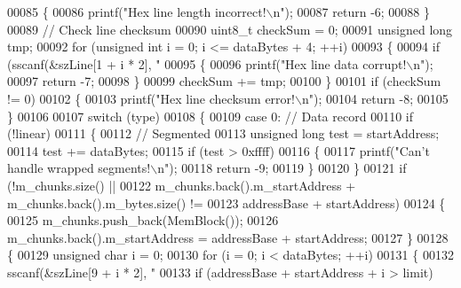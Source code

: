 \begin{DoxyCode}
{{00085         \{
00086             printf(\textcolor{stringliteral}{"Hex line length incorrect!\(\backslash\)n"});
00087             \textcolor{keywordflow}{return} -6;
00088         \}
00089         \textcolor{comment}{// Check line checksum}
00090         uint8\_t checkSum = 0;
00091         \textcolor{keywordtype}{unsigned} \textcolor{keywordtype}{long} tmp;
00092         \textcolor{keywordflow}{for} (\textcolor{keywordtype}{unsigned} \textcolor{keywordtype}{int} i = 0; i <= dataBytes + 4; ++i)
00093         \{
00094             \textcolor{keywordflow}{if} (sscanf(&szLine[1 + i * 2], \textcolor{stringliteral}{"%
00095             \{
00096                 printf(\textcolor{stringliteral}{"Hex line data corrupt!\(\backslash\)n"});
00097                 \textcolor{keywordflow}{return} -7;
00098             \}
00099             checkSum += tmp;
00100         \}
00101         \textcolor{keywordflow}{if} (checkSum != 0)
00102         \{
00103             printf(\textcolor{stringliteral}{"Hex line checksum error!\(\backslash\)n"});
00104             \textcolor{keywordflow}{return} -8;
00105         \}
00106 
00107         \textcolor{keywordflow}{switch} (type)
00108         \{
00109         \textcolor{keywordflow}{case} 0: \textcolor{comment}{// Data record}
00110             \textcolor{keywordflow}{if} (!linear)
00111             \{
00112                 \textcolor{comment}{// Segmented}
00113                 \textcolor{keywordtype}{unsigned} \textcolor{keywordtype}{long} test = startAddress;
00114                 test += dataBytes;
00115                 \textcolor{keywordflow}{if} (test > 0xffff)
00116                 \{
00117                     printf(\textcolor{stringliteral}{"Can't handle wrapped segments!\(\backslash\)n"});
00118                     \textcolor{keywordflow}{return} -9;
00119                 \}
00120             \}
00121             \textcolor{keywordflow}{if} (!m\_chunks.size() ||
00122                 m\_chunks.back().m\_startAddress + m\_chunks.back().m\_bytes.size() !=
00123                 addressBase + startAddress)
00124             \{
00125                 m\_chunks.push\_back(MemBlock());
00126                 m\_chunks.back().m\_startAddress = addressBase + startAddress;
00127             \}
00128             \{
00129                 \textcolor{keywordtype}{unsigned} \textcolor{keywordtype}{char} i = 0;
00130                 \textcolor{keywordflow}{for} (i = 0; i < dataBytes; ++i)
00131                 \{
00132                     sscanf(&szLine[9 + i * 2], \textcolor{stringliteral}{"%
00133                     \textcolor{keywordflow}{if} (addressBase + startAddress + i > limit)
}}}}
\end{DoxyCode}
